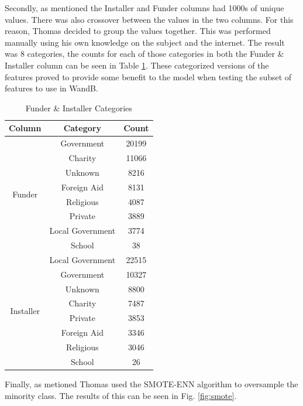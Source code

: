 \documentclass[conference]{IEEEtran}
\begin{document}
Secondly, as mentioned the Installer and Funder columns had 1000s of unique values. There was also crossover between the values in the two columns. For this reason, Thomas decided to group the values together. This was performed manually using his own knowledge on the subject and the internet. The result was 8 categories, the counts for each of those categories in both the Funder \& Installer column can be seen in Table \ref{tab:funder_installer_categories}. These categorized versions of the features proved to provide some benefit to the model when testing the subset of features to use in WandB.

\begin{table}[h]
  \centering
  \caption{Funder \& Installer Categories}
  \label{tab:funder_installer_categories}
  \begin{tabular}{|c|c|c|}
    \hline
    Column & Category & Count \\
    \hline
    \multirow{8}{*}{Funder} & Government & 20199 \\
    & Charity & 11066 \\
    & Unknown & 8216 \\
    & Foreign Aid & 8131 \\
    & Religious & 4087 \\
    & Private & 3889 \\
    & Local Government & 3774 \\
    & School & 38 \\
    \hline
    \multirow{8}{*}{Installer} & Local Government & 22515 \\
    & Government & 10327 \\
    & Unknown & 8800 \\
    & Charity & 7487 \\
    & Private & 3853 \\
    & Foreign Aid & 3346 \\
    & Religious & 3046 \\
    & School & 26 \\
    \hline
  \end{tabular}
\end{table}

Finally, as metioned Thomas used the SMOTE-ENN algorithm to oversample the minority class. The results of this can be seen in Fig. \ref{fig:smote}. 
\end{document}
